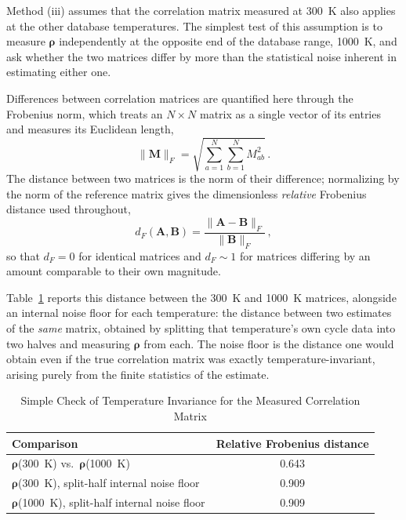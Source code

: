 \documentclass{style/nseJournal}
\begin{document}
Method (iii) assumes that the correlation matrix measured at 300~K also applies at the other database temperatures. The simplest test of this assumption is to measure $\boldsymbol\rho$ independently at the opposite end of the database range, 1000~K, and ask whether the two matrices differ by more than the statistical noise inherent in estimating either one.

Differences between correlation matrices are quantified here through the Frobenius norm, which treats an $N\times N$ matrix as a single vector of its entries and measures its Euclidean length,
\begin{equation}
  \|\mathbf{M}\|_F = \sqrt{\sum_{a=1}^{N}\sum_{b=1}^{N} M_{ab}^2}\,.
  \label{eqn:frobenius_norm}
\end{equation}
The distance between two matrices is the norm of their difference; normalizing by the norm of the reference matrix gives the dimensionless \emph{relative} Frobenius distance used throughout,
\begin{equation}
  d_F(\mathbf{A},\mathbf{B}) = \frac{\|\mathbf{A}-\mathbf{B}\|_F}{\|\mathbf{B}\|_F}\,,
  \label{eqn:frobenius_rel}
\end{equation}
so that $d_F=0$ for identical matrices and $d_F\!\sim\!1$ for matrices differing by an amount comparable to their own magnitude.

Table~\ref{tab:t_invariance} reports this distance between the 300~K and 1000~K matrices, alongside an internal noise floor for each temperature: the distance between two estimates of the \emph{same} matrix, obtained by splitting that temperature's own cycle data into two halves and measuring $\boldsymbol\rho$ from each. The noise floor is the distance one would obtain even if the true correlation matrix was exactly temperature-invariant, arising purely from the finite statistics of the estimate.

\begin{table}[h]
\centering
\caption{Simple Check of Temperature Invariance for the Measured Correlation Matrix}
\label{tab:t_invariance}
\begin{tabular}{lc}
\hline
Comparison & Relative Frobenius distance \\ \hline
$\boldsymbol\rho$(300~K) vs.\ $\boldsymbol\rho$(1000~K) & 0.643 \\
$\boldsymbol\rho$(300~K), split-half internal noise floor & 0.909 \\
$\boldsymbol\rho$(1000~K), split-half internal noise floor & 0.909 \\ \hline
\end{tabular}
\end{table}
\end{document}
